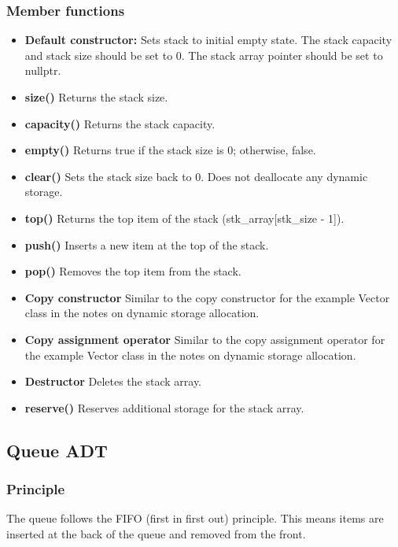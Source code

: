\documentclass{report}
\begin{document}
     \subsubsection{Member functions}
     \begin{itemize}
         \item \textbf{Default constructor:} Sets stack to initial empty state. The stack capacity and stack size should be set to 0. The stack array pointer should be set to nullptr.
         \item \textbf{size()} Returns the stack size.
         \item \textbf{capacity()} Returns the stack capacity.
         \item \textbf{empty()} Returns true if the stack size is 0; otherwise, false.
         \item \textbf{clear()} Sets the stack size back to 0. Does not deallocate any dynamic storage.
         \item \textbf{top()} Returns the top item of the stack (stk\_array[stk\_size - 1]).
         \item \textbf{push()} Inserts a new item at the top of the stack.
         \item \textbf{pop()} Removes the top item from the stack.
         \item \textbf{Copy constructor} Similar to the copy constructor for the example Vector class in the notes on dynamic storage allocation.
         \item \textbf{Copy assignment operator} Similar to the copy assignment operator for the example Vector class in the notes on dynamic storage allocation.
         \item \textbf{Destructor} Deletes the stack array.
         \item \textbf{reserve()} Reserves additional storage for the stack array.
     \end{itemize}

     \bigbreak \noindent 
     \subsection{Queue ADT}
     \bigbreak \noindent 
     \subsubsection{Principle}
     \bigbreak \noindent 
     The queue follows the FIFO (first in first out) principle. This means items are inserted at the back of the queue and removed from the front.
     \bigbreak \noindent 
\end{document}
